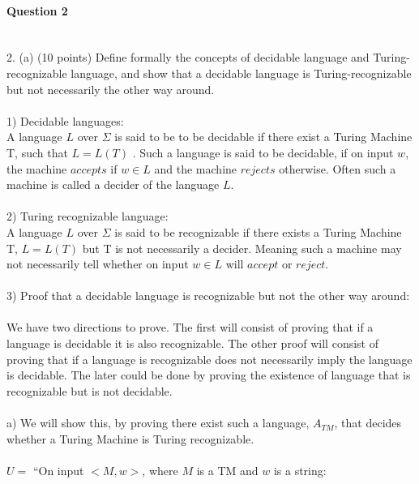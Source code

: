 \documentclass{report}
\newcommand{\me}[1]{
\begin{math}
#1
\end{math}
}
\begin{document}
\paragraph{\Large{Question 2\\ \\}}
2. (a) (10 points) Define formally the concepts of decidable language and Turing-recognizable language, and show that a decidable language is Turing-recognizable but not necessarily the other way around.  \\  \\
1) Decidable languages:\\  A language $L$ over $\Sigma$ is said to be to be decidable if there exist a Turing Machine T, such that \me{L = L(T) }. Such a language is said to be decidable, if on input $w$, the machine $accepts$ if $w \in L$ and the machine $rejects$ otherwise.  Often such a machine is called a decider of the language $L$.  \\ \\
2) Turing recognizable language: \\A language $L$ over $\Sigma$ is said to be recognizable 	if there exists a Turing Machine T, \me{L =L(T)} but T is not necessarily a decider. Meaning such a machine may not necessarily tell whether on input $w \in L$ will $accept$ or 
$reject$. \\ \\3) Proof that a decidable language is recognizable but not the other way around: \\\\ We have two directions to prove. The first will consist of proving that if a language is decidable it is also recognizable. The other proof will consist of proving that if a language is recognizable does not necessarily imply the language is decidable. The later could be done by proving the existence of language that is recognizable but is not decidable. \\ \\
a) We will show this, by proving there exist such a language, $A_{TM}$, that decides whether a Turing Machine is Turing recognizable. \\ \\
$U =$  ``On  input $<M,w>$, where $M$ is a TM and $w$ is a string: \\
\end{document}
